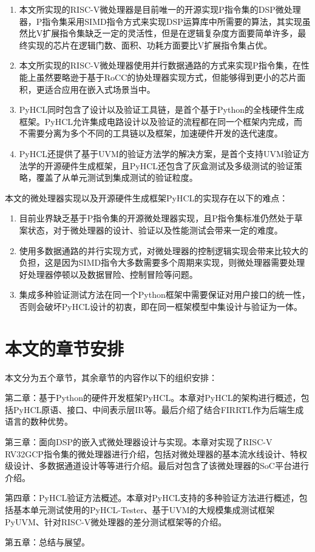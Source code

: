 \begin{enumerate}
	\item 本文所实现的RISC-V微处理器是目前唯一的开源实现P指令集的DSP微处理器，P指令集采用SIMD指令方式来实现DSP运算库中所需要的算法，其实现虽然比V扩展指令集缺乏一定的灵活性，但是在逻辑复杂度方面要简单许多，最终实现的芯片在逻辑门数、面积、功耗方面要比V扩展指令集占优。
	\item 本文所实现的RISC-V微处理器使用并行数据通路的方式来实现P指令集，在性能上虽然要略逊于基于RoCC的协处理器实现方式，但能够得到更小的芯片面积，更适合应用在嵌入式场景当中。
	\item PyHCL同时包含了设计以及验证工具链，是首个基于Python的全栈硬件生成框架。PyHCL允许集成电路设计以及验证的流程都在同一个框架内完成，而不需要分离为多个不同的工具链以及框架，加速硬件开发的迭代速度。
	\item PyHCL还提供了基于UVM的验证方法学的解决方案，是首个支持UVM验证方法学的开源硬件生成框架，且PyHCL还包含了灰盒测试及多级测试的验证策略，覆盖了从单元测试到集成测试的验证粒度。
\end{enumerate}

本文的微处理器实现以及开源硬件生成框架PyHCL的实现存在以下的难点：

\begin{enumerate}
	\item 目前业界缺乏基于P指令集的开源微处理器实现，且P指令集标准仍然处于草案状态，对于微处理器的设计、验证以及性能测试会带来一定的难度。
	\item 使用多数据通路的并行实现方式，对微处理器的控制逻辑实现会带来比较大的负担，这是因为SIMD指令大多数需要多个周期来实现，则微处理器需要处理好处理器停顿以及数据冒险、控制冒险等问题。
	\item 集成多种验证测试方法在同一个Python框架中需要保证对用户接口的统一性，否则会破坏PyHCL设计的初衷，即在同一框架模型中集设计与验证为一体。
\end{enumerate}

\section{本文的章节安排}

本文分为五个章节，其余章节的内容作以下的组织安排：

第二章：基于Python的硬件开发框架PyHCL。本章对PyHCL的架构进行概述，包括PyHCL原语、接口、中间表示层IR等。最后介绍了结合FIRRTL作为后端生成语言的数种优势。

第三章：面向DSP的嵌入式微处理器设计与实现。本章对实现了RISC-V RV32GCP指令集的微处理器进行介绍，包括对微处理器的基本流水线设计、特权级设计、多数据通道设计等等进行介绍。最后对包含了该微处理器的SoC平台进行介绍。

第四章：PyHCL验证方法概述。本章对PyHCL支持的多种验证方法进行概述，包括基本单元测试使用的PyHCL-Tester、基于UVM的大规模集成测试框架PyUVM、针对RISC-V微处理器的差分测试框架等的介绍。

第五章：总结与展望。
